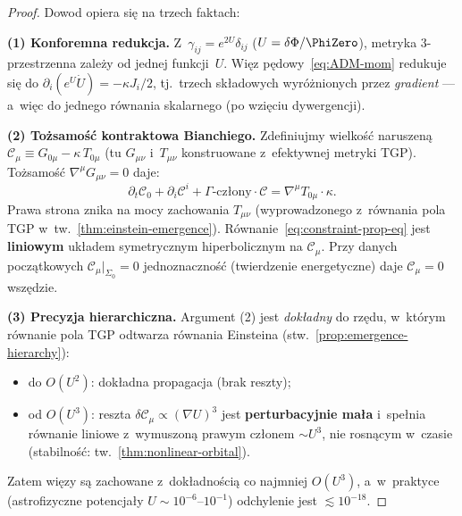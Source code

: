 \begin{proof}
Dowod opiera si\k{e} na trzech faktach:

\smallskip\noindent
\textbf{(1) Konforemna redukcja.}
Z~$\gamma_{ij} = e^{2U}\delta_{ij}$ ($U = \delta\Phi/\PhiZero$),
metryka $3$-przestrzenna zale\.zy od jednej funkcji~$U$.
Wi\k{e}z p\k{e}dowy~\eqref{eq:ADM-mom} redukuje si\k{e} do
$\partial_i(e^U\dot{U}) = -\kappa J_i/2$, tj.\ trzech
sk\l{}adowych wyr\'o\.znionych przez \emph{gradient} --- a~wi\k{e}c
do jednego r\'ownania skalarnego (po wzi\k{e}ciu dywergencji).

\smallskip\noindent
\textbf{(2) To\.zsamo\'s\'c kontraktowa Bianchiego.}
Zdefiniujmy wielko\'s\'c naruszen\k{a}
$\mathcal{C}_\mu \equiv G_{0\mu} - \kappa\,T_{0\mu}$
(tu $G_{\mu\nu}$ i~$T_{\mu\nu}$ konstruowane
z~efektywnej metryki TGP). To\.zsamo\'s\'c $\nabla^\mu G_{\mu\nu} = 0$
daje:
\begin{equation}\label{eq:constraint-prop-eq}
  \partial_t \mathcal{C}_0
  + \partial_i \mathcal{C}^i
  + \Gamma\text{-cz\l{}ony} \cdot \mathcal{C}
  = \nabla^\mu T_{0\mu} \cdot \kappa.
\end{equation}
Prawa strona znika na mocy zachowania $T_{\mu\nu}$
(wyprowadzonego z~r\'ownania pola TGP
w~tw.~\ref{thm:einstein-emergence}).
R\'ownanie~\eqref{eq:constraint-prop-eq} jest \textbf{liniowym}
uk\l{}adem symetrycznym hiperbolicznym na $\mathcal{C}_\mu$.
Przy danych pocz\k{a}tkowych $\mathcal{C}_\mu|_{\Sigma_0} = 0$
jednoznaczno\'s\'c (twierdzenie energetyczne) daje
$\mathcal{C}_\mu = 0$ wsz\k{e}dzie.

\smallskip\noindent
\textbf{(3) Precyzja hierarchiczna.}
Argument (2) jest \emph{dok\l{}adny} do rz\k{e}du, w~kt\'orym
r\'ownanie pola TGP odtwarza r\'ownania Einsteina
(stw.~\ref{prop:emergence-hierarchy}):
\begin{itemize}[nosep]
  \item do $O(U^2)$: dok\l{}adna propagacja (brak reszty);
  \item od $O(U^3)$: reszta
    $\delta\mathcal{C}_\mu \propto (\nabla U)^3$ jest
    \textbf{perturbacyjnie ma\l{}a} i~spe\l{}nia
    r\'ownanie liniowe z~wymuszon\k{a} prawym cz\l{}onem
    $\sim U^3$, nie rosn\k{a}cym w~czasie
    (stabilno\'s\'c: tw.~\ref{thm:nonlinear-orbital}).
\end{itemize}
Zatem wi\k{e}zy s\k{a} zachowane z~dok\l{}adno\'sci\k{a}
co najmniej $O(U^3)$, a~w~praktyce (astrofizyczne potencja\l{}y
$U \sim 10^{-6}$--$10^{-1}$) odchylenie jest $\lesssim 10^{-18}$.
\end{proof}

